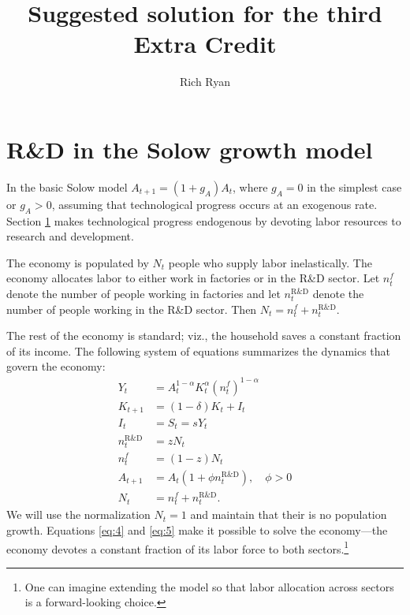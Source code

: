 \documentclass[12pt]{pracjourn_rwr}
\title{Suggested solution for the third  Extra Credit}
\author{Rich Ryan}
\theoremstyle{definition}
\theoremstyle{remark}
\begin{document}
\maketitle

\tableofcontents

\section{R\&D in the Solow growth model}
\label{sec:rd-solow-growth}

In the basic Solow model $A_{t+1} = (1+g_{A})A_{t}$,
where $g_{A} = 0$ in the simplest case or $g_{A} > 0$,
assuming that technological progress occurs at an exogenous rate.
Section \ref{sec:rd-solow-growth} makes technological progress endogenous
by devoting labor resources to research and development.

The economy is populated by $N_{t}$ people who supply labor inelastically.
The economy allocates labor to either work in factories or in the R\&D sector.
Let $n_{t}^{f}$ denote the number of people working in factories and
let $n_{t}^{\text{R\&D}}$ denote the number of people working in the R\&D sector.
Then $N_{t} = n_{t}^{f} + n_{t}^{\text{R\&D}}$.

The rest of the economy is standard; viz.,
the household saves a constant fraction of its income.
The following system of equations summarizes the dynamics that govern the economy:
\begin{align}
\label{eq:1}
Y_{t} &= A_{t}^{1-\alpha} K_{t}^{\alpha} \left( n_{t}^{f} \right)^{1-\alpha} \\
\label{eq:2}
K_{t+1} &= (1-\delta)K_{t} + I_{t} \\
\label{eq:3}
I_{t} &= S_{t} = sY_{t} \\
\label{eq:4}
n_{t}^{\text{R\&D}} &= zN_{t} \\
\label{eq:5}
n_{t}^{f} &= (1-z)N_{t} \\
\label{eq:6}
A_{t+1} &= A_{t} \left( 1+\phi n_{t}^{\text{R\&D}} \right), \quad \phi > 0 \\
\label{eq:7}
N_{t} &= n_{t}^{f} + n_{t}^{\text{R\&D}}. 
\end{align}
We will use the normalization $N_{t} = 1$ and maintain that their is no population growth.
Equations \eqref{eq:4} and \eqref{eq:5} make it possible to solve the economy---the economy devotes a constant fraction of its labor force to both sectors.\footnote{One can imagine extending the model so that labor allocation across sectors is a forward-looking choice.}
\end{document}
